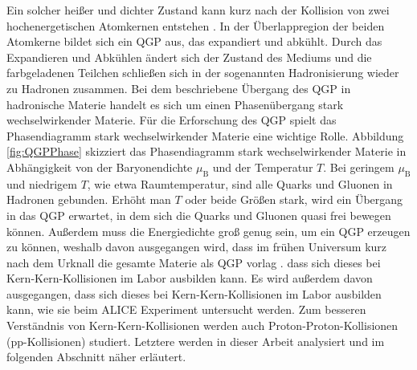 \newline
Ein solcher heißer und dichter Zustand kann kurz nach der Kollision von zwei hochenergetischen Atomkernen entstehen \cite{Karsch:2006xs}.
In der Überlappregion der beiden Atomkerne bildet sich ein QGP aus, das expandiert und abkühlt.
Durch das Expandieren und Abkühlen ändert sich der Zustand des Mediums und die farbgeladenen Teilchen schließen sich in der sogenannten Hadronisierung wieder zu Hadronen zusammen.
Bei dem beschriebene Übergang des QGP in hadronische Materie handelt es sich um einen Phasenübergang stark wechselwirkender Materie.
\newline
Für die Erforschung des QGP spielt das Phasendiagramm stark wechselwirkender Materie eine wichtige Rolle.
Abbildung \ref{fig:QGPPhase} skizziert das Phasendiagramm stark wechselwirkender Materie in Abhängigkeit von der Baryonendichte $\mu_{\text{B}}$ und der Temperatur $T$.
Bei geringem $\mu_{\text{B}}$ und niedrigem $T$, wie etwa Raumtemperatur, sind alle Quarks und Gluonen in Hadronen gebunden.
Erhöht man $T$ oder beide Größen stark, wird ein Übergang in das QGP erwartet, in dem sich die Quarks und Gluonen quasi frei bewegen können.
Außerdem muss die Energiedichte groß genug sein, um ein QGP erzeugen zu können, weshalb davon ausgegangen wird, dass im frühen Universum kurz nach dem Urknall die gesamte Materie als QGP vorlag \cite{Kapusta:2000fe}. 
dass sich dieses bei Kern-Kern-Kollisionen im Labor ausbilden kann.
Es wird außerdem davon ausgegangen, dass sich dieses bei Kern-Kern-Kollisionen im Labor ausbilden kann, wie sie beim ALICE Experiment untersucht werden.
\newline
Zum besseren Verständnis von Kern-Kern-Kollisionen werden auch Proton-Proton-Kollisionen (pp-Kollisionen) studiert.
Letztere werden in dieser Arbeit analysiert und im folgenden Abschnitt näher erläutert.
